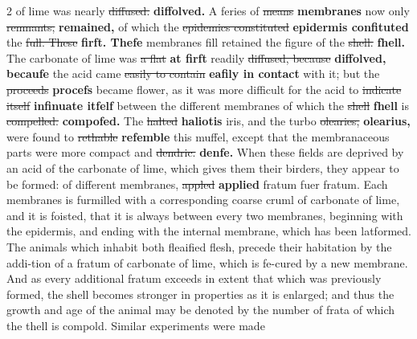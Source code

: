 \documentclass[10pt]{article}
\begin{document}
\begin{multicols}{2}
of lime was nearly \sout{diffused.} \textbf{diffolved.} A feries of \sout{means} \textbf{membranes} now only \sout{remnants,} \textbf{remained,} of which the \sout{epidemics constituted} \textbf{epidermis confituted} the \sout{full. These} \textbf{firft. Thefe} membranes fill retained the figure of the \sout{shell.} \textbf{fhell.} The carbonate of lime was \sout{a flat} \textbf{at firft} readily \sout{diffused, because} \textbf{diffolved, becaufe} the acid came \sout{easily to contain} \textbf{eafily in contact} with it; but the \sout{proceeds} \textbf{procefs} became flower, as it was more difficult for the acid to \sout{indicate itself} \textbf{infinuate itfelf} between the different membranes of which the \sout{shell} \textbf{fhell} is \sout{compelled.} \textbf{compofed.} The \sout{halted} \textbf{haliotis} iris, and the turbo \sout{olearies,} \textbf{olearius,} were found to \sout{rethable} \textbf{refemble} this muffel, except that the membranaceous parts were more compact and \sout{dendric.} \textbf{denfe.} When these fields are deprived by an acid of the carbonate of lime, which gives them their birders, they appear to be formed: of different membranes, \sout{appled} \textbf{applied} fratum fuer fratum. Each membranes is furmilled with a corresponding coarse cruml of carbonate of lime, and it is foisted, that it is always between every two membranes, beginning with the epidermis, and ending with the internal membrane, which has been latformed. The animals which inhabit both fleaified flesh, precede their habitation by the addi-tion of a fratum of carbonate of lime, which is fe-cured by a new membrane. And as every additional fratum exceeds in extent that which was previously formed, the shell becomes stronger in properties as it is enlarged; and thus the growth and age of the animal may be denoted by the number of frata of which the thell is compold. Similar experiments were made


\end{multicols}
\end{document}
